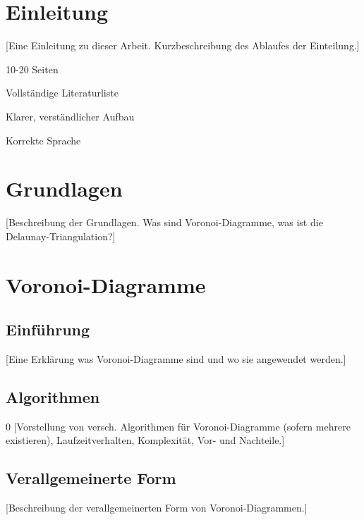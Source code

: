 \documentclass[pdftex,12pt,a4paper]{article}
\begin{document}


\newpage

\tableofcontents

\newpage

\section{Einleitung}

[Eine Einleitung zu dieser Arbeit. Kurzbeschreibung des Ablaufes der Einteilung.]

\noindent [TODO:]
\begin{compactitem}
	\item 10-20 Seiten
	\item Vollständige Literaturliste
	\item Klarer, verständlicher Aufbau
	\item Korrekte Sprache
\end{compactitem}

\newpage

\section{Grundlagen}

[Beschreibung der Grundlagen. Was sind Voronoi-Diagramme, was ist die Delaunay-Triangulation?]

\newpage

\section{Voronoi-Diagramme}

\subsection{Einführung}
[Eine Erklärung was Voronoi-Diagramme sind und wo sie angewendet werden.]

\subsection{Algorithmen}0
[Vorstellung von versch. Algorithmen für Voronoi-Diagramme (sofern mehrere existieren), Laufzeitverhalten, Komplexität, Vor- und Nachteile.]

\subsection{Verallgemeinerte Form}
[Beschreibung der verallgemeinerten Form von Voronoi-Diagrammen.]
\end{document}
